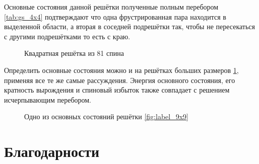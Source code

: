 \documentclass[utf8, babel, sor, jor, amsmath,amssymb, reprint]{elsarticle} %
\begin{document}
Основные состояния данной решётки полученные полным перебором \ref{tab:gs_4x4} подтверждают что одна фрустрированная пара находится в выделенной области, а вторая в соседней подрешётки так, чтобы не пересекаться с другими подрешётками то есть с краю.

\begin{figure}[h]
	\centering
	\caption{Квадратная решётка из 81 спина}
	\label{fig:label_9x9}
\end{figure}



Определить основные состояния можно и на решётках больших размеров \ref{fig:label_9x9}, применяя все те же самые рассуждения. Энергия основного состояния, его кратность вырождения и спиновый избыток также совпадает с решением исчерпывающим перебором.

\begin{figure}[h]
	\centering
	\caption{Одно из основных состояний решётки \eqref{fig:label_9x9}}
	\label{fig:label_9x9_gs_1}
\end{figure}




\section{Благодарности}

 


\end{document}
